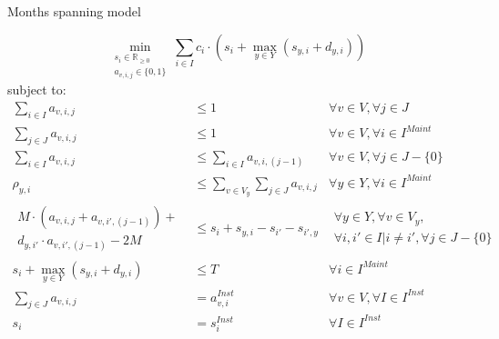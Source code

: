 \documentclass{beamer}
\begin{document}

\begin{frame}{Months spanning model}
\scriptsize

\begin{equation}
	\min_{\substack{s_i \in \mathbb{R}_{\geq 0} \\ 
	a_{v,i,j} \in \{0, 1\}}} 
	\sum_{i \in I} c_i \cdot (s_i + \max_{y \in Y} (s_{y,i}+ d_{y,i}))
\end{equation}
subject to:
\begin{align}
\sum_{i \in I} a_{v,i,j}						&\leq 		1							& \forall v \in V, \forall j \in J 						\\
\sum_{j \in J} a_{v,i,j}						&\leq 		1							& \forall v \in V, \forall i \in I^{Maint}					\\
\sum_{i \in I} a_{v,i,j}						&\leq 		\sum_{i \in I} a_{v,i,(j-1)}				& \forall v \in V, \forall j \in J - \{ 0 \}					\\
\rho_{y,i}								&\leq	 	\sum_{v \in V_y} \sum_{j \in J} a_{v,i,j} 	& \forall y \in Y, \forall i \in I^{Maint}					\\	
\begin{aligned} M \cdot (a_{v,i,j} + a_{v,i',(j-1)}) + \\ 
d_{y,i'} \cdot a_{v,i',(j-1)} - 2M \end{aligned}			&\leq	 	s_i + s_{y,i} - s_{i'} - s_{i',y}			& \begin{aligned} \forall y \in Y, \forall v \in V_y, 			\\
																		\forall i, i' \in I | i \neq i', \forall j \in J - \{ 0 \}	\end{aligned}	\\
s_i + \max_{y \in Y} (s_{y,i}+ d_{y,i})				&\leq		T 							&\forall i \in I^{Maint}							\\
\sum_{j \in J} a_{v,i,j}						&=		a^{Inst}_{v,i}					& \forall v \in V, \forall I \in I^{Inst}  					\\
s_i									&=		s^{Inst}_i 						& \forall I \in I^{Inst}  					
\end{align}

\end{frame}
\end{document}

